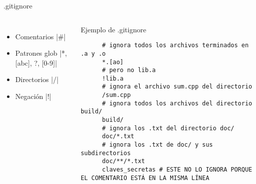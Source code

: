 \begin{frame}[fragile]{.gitignore}
  \begin{columns}[onlytextwidth]
    \begin{itemize}
      \item \alert{Comentarios} |#|
      \item \alert{Patrones glob} |*, [abc], ?, [0-9]|
      \item \alert{Directorios} |/|
      \item \alert{Negación} |!|
    \end{itemize}
    \begin{exampleblock}{Ejemplo de .gitignore}
    \begin{verbatim}
      # ignora todos los archivos terminados en .a y .o
      *.[ao]
      # pero no lib.a
      !lib.a
      # ignora el archivo sum.cpp del directorio
      /sum.cpp
      # ignora todos los archivos del directorio build/
      build/
      # ignora los .txt del directorio doc/
      doc/*.txt
      # ignora los .txt de doc/ y sus subdirectorios
      doc/**/*.txt
      claves_secretas # ESTE NO LO IGNORA PORQUE EL COMENTARIO ESTÁ EN LA MISMA LÍNEA
    \end{verbatim}
  \end{exampleblock}
  \end{columns}
\end{frame}
